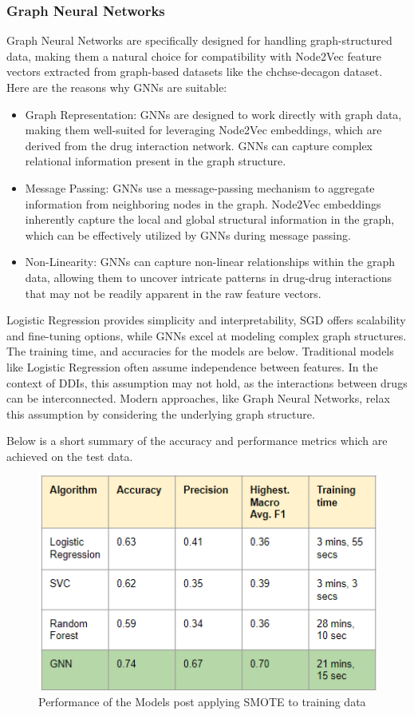 \documentclass[journal,transmag]{J-NaNA}
\begin{document}
\subsubsection{Graph Neural Networks}
Graph Neural Networks are specifically designed for handling graph-structured data, making them a natural choice for compatibility with Node2Vec feature vectors extracted from graph-based datasets like the chchse-decagon dataset. Here are the reasons why GNNs are suitable:
\begin{itemize}
    \item Graph Representation: GNNs are designed to work directly with graph data, making them well-suited for leveraging Node2Vec embeddings, which are derived from the drug interaction network. GNNs can capture complex relational information present in the graph structure.
    \item Message Passing: GNNs use a message-passing mechanism to aggregate information from neighboring nodes in the graph. Node2Vec embeddings inherently capture the local and global structural information in the graph, which can be effectively utilized by GNNs during message passing.
    \item Non-Linearity: GNNs can capture non-linear relationships within the graph data, allowing them to uncover intricate patterns in drug-drug interactions that may not be readily apparent in the raw feature vectors.
\end{itemize}
Logistic Regression provides simplicity and interpretability, SGD offers scalability and fine-tuning options, while GNNs excel at modeling complex graph structures. The training time, and accuracies for the models are below. Traditional models like Logistic Regression often assume independence between features. In the context of DDIs, this assumption may not hold, as the interactions between drugs can be interconnected. Modern approaches, like Graph Neural Networks, relax this assumption by considering the underlying graph structure. 

Below is a short summary of the accuracy and performance metrics which are achieved on the test data. 
\begin{figure}[htbp]
\centering
\includegraphics[width=\linewidth]{performance-metrics-1.PNG} 
\caption{Performance of the Models post applying SMOTE to training data} 
\label{fig: Performance Metrics} %
\end{figure}
\end{document}
